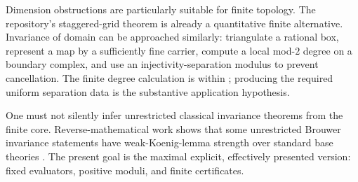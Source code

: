 Dimension obstructions are particularly suitable for finite topology.  The repository's staggered-grid theorem is already a quantitative finite alternative.  Invariance of domain can be approached similarly: triangulate a rational box, represent a map by a sufficiently fine carrier, compute a local mod-$2$ degree on a boundary complex, and use an injectivity-separation modulus to prevent cancellation.  The finite degree calculation is within \ipra; producing the required uniform separation data is the substantive application hypothesis.

One must not silently infer unrestricted classical invariance theorems from the finite core.  Reverse-mathematical work shows that some unrestricted Brouwer invariance statements have weak-Koenig-lemma strength over standard base theories \cite{Kihara2020}.  The present goal is the maximal explicit, effectively presented version: fixed evaluators, positive moduli, and finite certificates.
